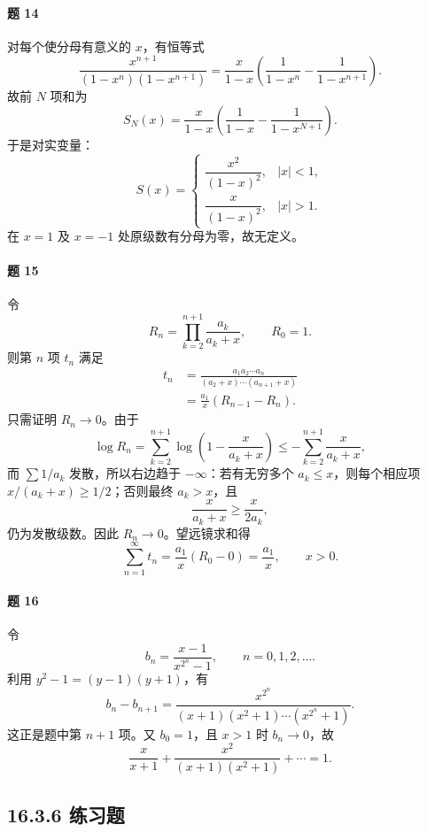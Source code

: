 \paragraph{题 14}
\begin{xsolution}
对每个使分母有意义的 $x$，有恒等式
\[
  \frac{x^{n+1}}{(1-x^n)(1-x^{n+1})}
  =\frac{x}{1-x}
  \left(\frac1{1-x^n}-\frac1{1-x^{n+1}}\right).
\]
故前 $N$ 项和为
\[
  S_N(x)=\frac{x}{1-x}
  \left(\frac1{1-x}-\frac1{1-x^{N+1}}\right).
\]
于是对实变量：
\[
  S(x)=
  \begin{cases}
    \dfrac{x^2}{(1-x)^2},&|x|<1,\\[6pt]
    \dfrac{x}{(1-x)^2},&|x|>1.
  \end{cases}
\]
在 $x=1$ 及 $x=-1$ 处原级数有分母为零，故无定义。
\end{xsolution}

\paragraph{题 15}
\begin{xsolution}
令
\[
  R_n=\prod_{k=2}^{n+1}\frac{a_k}{a_k+x},\qquad R_0=1.
\]
则第 $n$ 项 $t_n$ 满足
\[
\begin{aligned}
  t_n
  &=\frac{a_1a_2\cdots a_n}
  {(a_2+x)\cdots(a_{n+1}+x)}\\
  &=\frac{a_1}{x}(R_{n-1}-R_n).
\end{aligned}
\]
只需证明 $R_n\to0$。由于
\[
  \log R_n
  =\sum_{k=2}^{n+1}\log\left(1-\frac{x}{a_k+x}\right)
  \leqslant-\sum_{k=2}^{n+1}\frac{x}{a_k+x},
\]
而 $\sum1/a_k$ 发散，所以右边趋于 $-\infty$：若有无穷多个 $a_k\leqslant x$，则每个相应项 $x/(a_k+x)\geqslant1/2$；否则最终 $a_k>x$，且
\[
  \frac{x}{a_k+x}\geqslant\frac{x}{2a_k},
\]
仍为发散级数。因此 $R_n\to0$。望远镜求和得
\[
  \sum_{n=1}^{\infty}t_n
  =\frac{a_1}{x}(R_0-0)=\frac{a_1}{x},\qquad x>0.
\]
\end{xsolution}

\paragraph{题 16}
\begin{xsolution}
令
\[
  b_n=\frac{x-1}{x^{2^n}-1},\qquad n=0,1,2,\ldots.
\]
利用 $y^2-1=(y-1)(y+1)$，有
\[
  b_n-b_{n+1}
  =\frac{x^{2^n}}{(x+1)(x^2+1)\cdots(x^{2^n}+1)}.
\]
这正是题中第 $n+1$ 项。又 $b_0=1$，且 $x>1$ 时 $b_n\to0$，故
\[
  \frac{x}{x+1}+\frac{x^2}{(x+1)(x^2+1)}+\cdots=1.
\]
\end{xsolution}


\subsection*{16.3.6 练习题}

